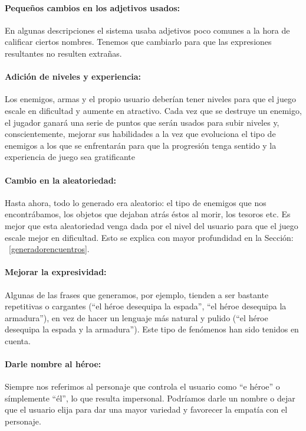 \paragraph{Pequeños cambios en los adjetivos usados:} En algunas descripciones el sistema usaba adjetivos poco comunes a la hora de calificar ciertos nombres. Tenemos que cambiarlo para que las expresiones resultantes no resulten extrañas.

\paragraph{Adición de niveles y experiencia:} Los enemigos, armas y el propio usuario deberían tener niveles para que el juego escale en dificultad y aumente en atractivo. Cada vez que se destruye un enemigo, el jugador ganará una serie de puntos que serán usados para subir niveles y, conscientemente, mejorar sus habilidades a la vez que evoluciona el tipo de enemigos a los que se enfrentarán para que la progresión tenga sentido y la experiencia de juego sea gratificante

\paragraph{Cambio en la aleatoriedad:} Hasta ahora, todo lo generado era aleatorio: el tipo de enemigos que nos encontrábamos, los objetos que dejaban atrás éstos al morir, los tesoros etc. Es mejor que esta aleatoriedad venga dada por el nivel del usuario para que el juego escale mejor en dificultad. Esto se explica con mayor profundidad en la Sección: ~\ref{generadorencuentros}.

\paragraph{Mejorar la expresividad:} Algunas de las frases que generamos, por ejemplo, tienden a ser bastante repetitivas o cargantes (``el héroe desequipa la espada'', ``el héroe desequipa la armadura''), en vez de hacer un lenguaje más natural y pulido (``el héroe desequipa la espada y la armadura''). Este tipo de fenómenos han sido tenidos en cuenta.

\paragraph{Darle nombre al héroe:} Siempre nos referimos al personaje que controla el usuario como ``e héroe'' o símplemente ``él'', lo que resulta impersonal. Podríamos darle un nombre o dejar que el usuario elija para dar una mayor variedad y favorecer la empatía con el personaje.

